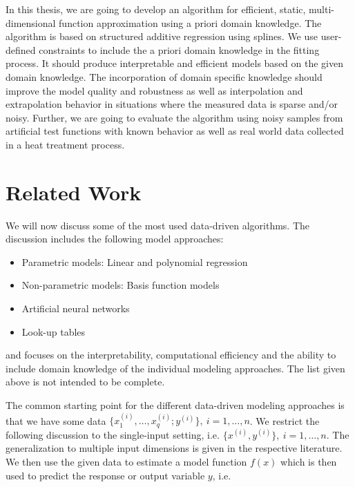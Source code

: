 In this thesis, we are going to develop an algorithm for efficient, static, multi-dimensional function approximation using a priori domain knowledge. The algorithm is based on structured additive regression using splines\cite{fahrmeir2007regression}. We use user-defined constraints to include the a priori domain knowledge in the fitting process\cite{hofner2011monotonicity}. It should produce interpretable and efficient models based on the given domain knowledge. The incorporation of domain specific knowledge should improve the model quality and robustness as well as interpolation and extrapolation behavior in situations where the measured data is sparse and/or noisy. Further, we are going to evaluate the algorithm using noisy samples from artificial test functions with known behavior as well as real world data collected in a heat treatment process. 
\section{Related Work}

We will now discuss some of the most used data-driven algorithms. The discussion includes the following model approaches:

\begin{itemize}
	\item Parametric models: Linear and polynomial regression
	\item Non-parametric models: Basis function models
	\item Artificial neural networks
	\item Look-up tables
\end{itemize}

and focuses on the interpretability, computational efficiency and the ability to include domain knowledge of the individual modeling approaches. The list given above is not intended to be complete. 

The common starting point for the different data-driven modeling approaches is that we have some data $\{x_1^{(i)}, \dots, x_q^{(i)}; y^{(i)} \}, \ i = 1, \dots, n$. We restrict the following discussion to the single-input setting, i.e. $\{x^{(i)}, y^{(i)}\}, \ i=1, \dots, n$. The generalization to multiple input dimensions is given in the respective literature. We then use the given data to estimate a model function $f(x)$  which is then used to predict the response or output variable $y$, i.e.

